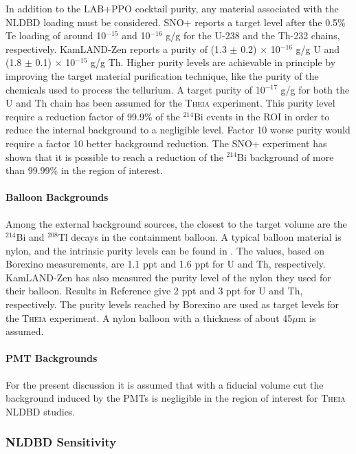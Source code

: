 In addition to the LAB+PPO cocktail purity, any material associated with the
NLDBD loading must be considered. SNO+ reports a target level after the
0.5\% Te loading of around 10$^{-15}$ and
10$^{-16}$ g/g for the U-238 and the Th-232 chains, respectively.
KamLAND-Zen \cite{gando13} reports a purity of 
(1.3 $\pm$ 0.2) $\times$ 10$^{-16}$ g/g U and
(1.8 $\pm$ 0.1) $\times$ 10$^{-15}$ g/g Th.
Higher purity levels are achievable in principle by improving the target
material purification technique, like the purity of the chemicals used to process the tellurium. A target purity of 10$^{-17}$ g/g for both the U and Th chain has been
assumed for the \textsc{Theia} experiment. This purity level require a reduction factor of 99.9\% of the $^{214}$Bi events in the ROI in order to reduce the internal background to a negligible level. Factor 10 worse purity would require a factor 10 better background reduction. The SNO+ experiment has shown that it is possible to reach a reduction of the $^{214}$Bi background of more than 99.99\% in the region of interest.%

\paragraph{Balloon Backgrounds}
Among the external background sources, the closest to the target volume are
the $^{214}$Bi and $^{208}$Tl decays in the containment balloon. A typical
balloon material is nylon, and the intrinsic purity levels can be found in
\cite{radiopurityorg}. The values, based on Borexino measurements, are
1.1 ppt and 1.6 ppt for U and Th, respectively. KamLAND-Zen has also measured
the purity level of the nylon they used for their balloon. Results
in Reference \cite{kamLAND_Zen} give 2 ppt and 3 ppt for U and Th, respectively.
The purity levels reached by Borexino are used as target levels for the
\textsc{Theia} experiment. A nylon balloon with a thickness of about 45$\mu$m is assumed.

\paragraph{PMT Backgrounds}
For the present discussion it is assumed that with a fiducial volume cut the
background induced by the PMTs is negligible in the region of interest for
\textsc{Theia} NLDBD studies.

\subsubsection{NLDBD Sensitivity}
\label{sec::sensitivity}
